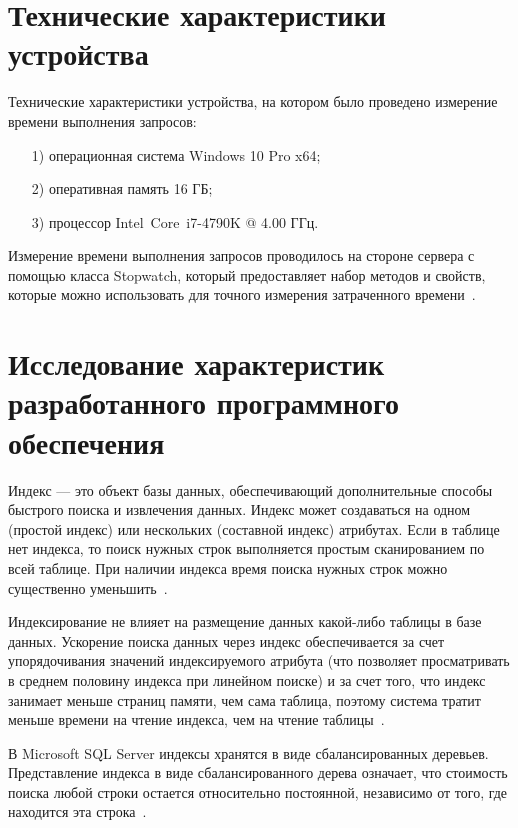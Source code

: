\documentclass{bmstu}
\begin{document}
\section{Технические характеристики устройства}

Технические характеристики устройства, на котором было проведено измерение времени выполнения запросов:

\begin{enumerate}
\item[1)]
операционная система Windows 10 Pro x64;
\item[2)]
оперативная память 16 ГБ;
\item[3)]
процессор Intel\textregistered ~Core\texttrademark ~i7-4790K @ 4.00 ГГц.
\end{enumerate}

Измерение времени выполнения запросов проводилось на стороне сервера с помощью класса Stopwatch, который предоставляет набор методов и свойств, которые можно использовать для точного измерения затраченного времени~\cite{Stopwatch}.

\section{Исследование характеристик разработанного программного обеспечения}

Индекс --- это объект базы данных, обеспечивающий дополнительные способы быстрого
поиска и извлечения данных. 
Индекс может создаваться на одном (простой индекс) или нескольких (составной индекс) атрибутах. 
Если в таблице нет индекса, то поиск нужных строк выполняется простым сканированием по всей таблице. 
При наличии индекса время поиска нужных строк можно существенно уменьшить~\cite{Gavrilova2022}. 

Индексирование не влияет на размещение данных какой-либо таблицы в базе данных. 
Ускорение поиска данных через индекс обеспечивается за счет упорядочивания значений индексируемого атрибута (что позволяет просматривать в среднем половину индекса при линейном поиске) и за счет того, что индекс занимает меньше страниц памяти, чем сама таблица, поэтому система тратит меньше времени на чтение индекса, чем на чтение таблицы~\cite{Karpova2009}.

В Microsoft SQL Server индексы хранятся в виде сбалансированных деревьев. 
Представление индекса в виде сбалансированного дерева означает, что стоимость поиска любой строки остается относительно постоянной, независимо от того, где находится эта строка~\cite{Gavrilova2022}.
\end{document}
